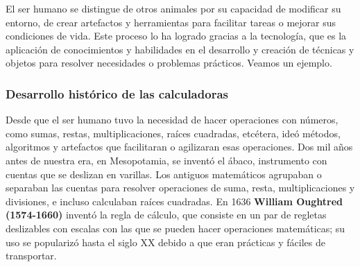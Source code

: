 \documentclass[11pt]{book}
\begin{document}
El ser humano se distingue de otros animales por su capacidad de modificar su
entorno, de crear artefactos y herramientas para
facilitar tareas o mejorar sus condiciones de vida. Este proceso lo ha logrado
gracias a la tecnolog\'ia, que es la aplicaci\'on de
conocimientos y habilidades en el desarrollo y creaci\'on de t\'ecnicas y objetos
para resolver necesidades o problemas pr\'acticos.
Veamos un ejemplo.

\subsubsection{Desarrollo hist\'orico de las calculadoras}
Desde que el ser humano tuvo la necesidad de hacer operaciones con n\'umeros,
como sumas, restas, multiplicaciones, ra\'ices
cuadradas, etc\'etera, ide\'o m\'etodos, algoritmos y artefactos que facilitaran o
agilizaran esas operaciones.
Dos mil años antes de nuestra era, en Mesopotamia, se invent\'o el \'abaco,
instrumento con cuentas que se deslizan en varillas.
Los antiguos matem\'aticos agrupaban o separaban las cuentas para resolver
operaciones de suma, resta, multiplicaciones y
divisiones, e incluso calculaban ra\'ices cuadradas.
En 1636 \textbf{William Oughtred (1574-1660)} invent\'o la regla de c\'alculo, que
consiste en un par de regletas deslizables con
escalas con las que se pueden hacer operaciones matem\'aticas; su uso se
populariz\'o hasta el siglo XX debido a que eran pr\'acticas
y f\'aciles de transportar.
\end{document}
